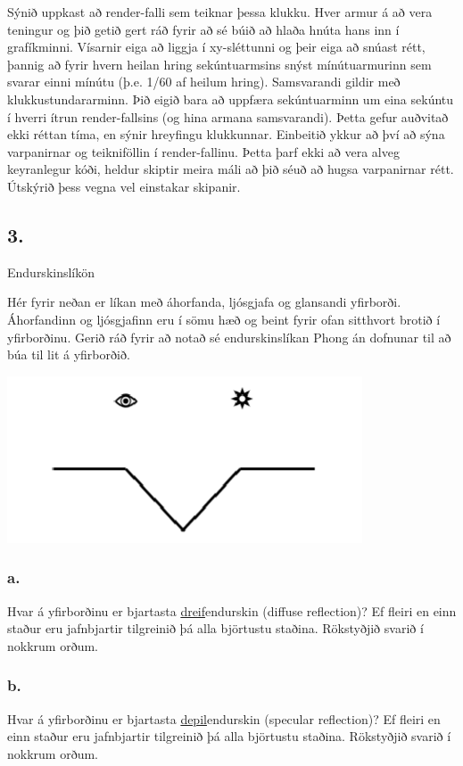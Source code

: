 \documentclass{article}
\begin{document}
Sýnið uppkast að render-falli sem teiknar þessa klukku. Hver armur á að vera
teningur og þið getið gert ráð fyrir að sé búið að hlaða hnúta hans inn í
grafíkminni. Vísarnir eiga að liggja í xy-sléttunni og þeir eiga að snúast rétt,
þannig að fyrir hvern heilan hring sekúntuarmsins snýst mínútuarmurinn sem
svarar einni mínútu (þ.e. 1/60 af heilum hring). Samsvarandi gildir með
klukkustundararminn. Þið eigið bara að uppfæra sekúntuarminn um eina sekúntu í
hverri ítrun render-fallsins (og hina armana samsvarandi). Þetta gefur auðvitað
ekki réttan tíma, en sýnir hreyfingu klukkunnar.
Einbeitið ykkur að því að sýna varpanirnar og teikniföllin í render-fallinu. Þetta
þarf ekki að vera alveg keyranlegur kóði, heldur skiptir meira máli að þið séuð að
hugsa varpanirnar rétt. Útskýrið þess vegna vel einstakar skipanir.

\newpage

\subsection{3.} Endurskinslíkön

Hér fyrir neðan er líkan með áhorfanda, ljósgjafa og glansandi yfirborði.
Áhorfandinn og ljósgjafinn eru í sömu hæð og beint fyrir ofan sitthvort brotið í
yfirborðinu. Gerið ráð fyrir að notað sé endurskinslíkan Phong án dofnunar til að
búa til lit á yfirborðið.

\begin{center}
\includegraphics[scale = 0.9]{myndir/Endurskin.png}
\end{center}


\subsubsection{a.}Hvar á yfirborðinu er bjartasta \underline{dreif}endurskin (diffuse reflection)? Ef fleiri en
einn staður eru jafnbjartir tilgreinið þá alla björtustu staðina. Rökstyðjið
svarið í nokkrum orðum.

\subsubsection{b.}Hvar á yfirborðinu er bjartasta \underline{depil}endurskin (specular reflection)? Ef fleiri
en einn staður eru jafnbjartir tilgreinið þá alla björtustu staðina. Rökstyðjið
svarið í nokkrum orðum.
\end{document}
